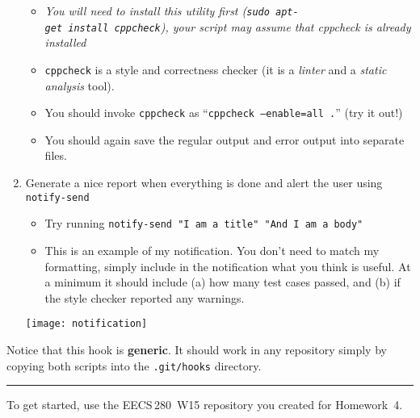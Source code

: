 \documentclass{article}
\begin{document}
\begin{enumerate}
    \begin{itemize}
      \item \emph{\small You will need to install this utility first
        (\texttt{sudo~apt-get~install~cppcheck}), your script may assume that
        cppcheck is already installed}
      \item \texttt{cppcheck} is a style and correctness checker (it is a
        \emph{linter} and a \emph{static analysis} tool).
      \item You should invoke \texttt{cppcheck} as
        ``\texttt{cppcheck~--enable=all~.}'' (try it out!)
      \item You should again save the regular output and error output into
        separate files.
    \end{itemize}
  \item Generate a nice report when everything is done and alert the user
    using \texttt{notify-send}\\
    \begin{minipage}{0.6\textwidth}
      \begin{itemize}
        \item Try running \texttt{notify-send "I am a title" "And I am a body"}
        \item This is an example of my notification. You don't need to match my
          formatting, simply include in the notification what you think is
          useful. At a minimum it should include (a) how many test cases passed,
          and (b) if the style checker reported any warnings.
      \end{itemize}
    \end{minipage}
    \hfill
    \begin{minipage}{0.3\textwidth}
      \texttt{[image: notification]}
    \end{minipage}
\end{enumerate}

\medskip
\noindent
Notice that this hook is \textbf{generic}. It should work in any repository
simply by copying both scripts into the \texttt{.git/hooks} directory.

\bigskip
\hrule
\bigskip

\medskip
\noindent
To get started, use the EECS\,280~W15 repository you created for Homework~4.
\end{document}
